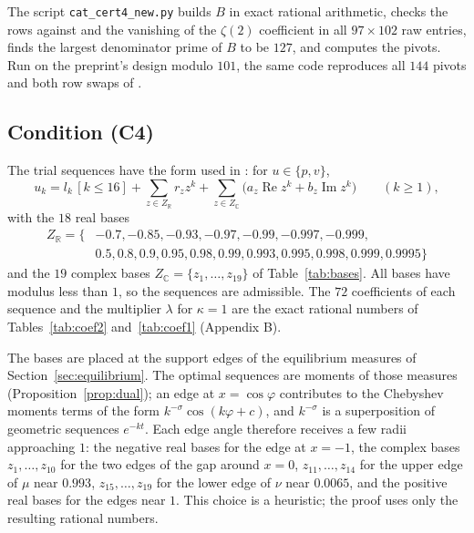 \documentclass[11pt]{article}
\theoremstyle{definition}
\begin{document}
The script \texttt{cat\_cert4\_new.py} builds $B$ in exact rational arithmetic, checks the rows against \cite[Eq.~(3)]{OAI} and the vanishing of the $\zeta(2)$ coefficient in all $97\times102$ raw entries, finds the largest denominator prime of $B$ to be $127$, and computes the pivots. Run on the preprint's design modulo $101$, the same code reproduces all $144$ pivots and both row swaps of \cite[Table~1]{OAI}.

\subsection{Condition (C4)}

The trial sequences have the form used in \cite[Sec.~7]{OAI}: for $u\in\{p,v\}$,
\[
u_k=l_k\,[k\le16]+\sum_{z\in Z_{\mathbb R}}r_zz^k+\sum_{z\in Z_{\mathbb C}}\big(a_z\operatorname{Re}z^k+b_z\operatorname{Im}z^k\big)\qquad(k\ge1),
\]
with the $18$ real bases
\begin{align*}
Z_{\mathbb R}=\{&-0.7,-0.85,-0.93,-0.97,-0.99,-0.997,-0.999,\\
&0.5,0.8,0.9,0.95,0.98,0.99,0.993,0.995,0.998,0.999,0.9995\}
\end{align*}
and the $19$ complex bases $Z_{\mathbb C}=\{z_1,\dots,z_{19}\}$ of Table~\ref{tab:bases}. All bases have modulus less than $1$, so the sequences are admissible. The $72$ coefficients of each sequence and the multiplier $\lambda$ for $\kappa=1$ are the exact rational numbers of Tables~\ref{tab:coef2} and~\ref{tab:coef1} (Appendix B).

The bases are placed at the support edges of the equilibrium measures of Section~\ref{sec:equilibrium}. The optimal sequences are moments of those measures (Proposition~\ref{prop:dual}); an edge at $x=\cos\varphi$ contributes to the Chebyshev moments terms of the form $k^{-\sigma}\cos(k\varphi+c)$, and $k^{-\sigma}$ is a superposition of geometric sequences $e^{-kt}$. Each edge angle therefore receives a few radii approaching $1$: the negative real bases for the edge at $x=-1$, the complex bases $z_1,\dots,z_{10}$ for the two edges of the gap around $x=0$, $z_{11},\dots,z_{14}$ for the upper edge of $\mu$ near $0.993$, $z_{15},\dots,z_{19}$ for the lower edge of $\nu$ near $0.0065$, and the positive real bases for the edges near $1$. This choice is a heuristic; the proof uses only the resulting rational numbers.
\end{document}
